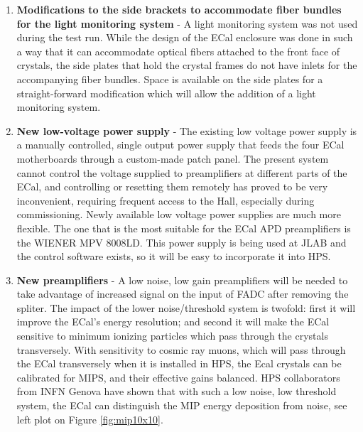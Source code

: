 \begin{enumerate}
\item {\bf Modifications to the side brackets to accommodate fiber bundles for the light monitoring system} -
A light monitoring system was not used during the test run. While the design of the ECal enclosure was done in such a way that it can 
accommodate optical fibers attached to the front face of crystals, the side plates that hold the crystal frames do not have inlets for the accompanying fiber bundles.
Space is available on the side plates for a straight-forward modification which will allow the addition of a light monitoring system.  
    
\item {\bf New low-voltage power supply} - The existing low voltage power supply is a manually controlled, single output power supply 
that feeds the four ECal motherboards through a custom-made patch panel. The present system cannot control the voltage supplied to preamplifiers at different
parts of the ECal, and controlling or resetting them remotely has proved to be very inconvenient, requiring frequent access to the Hall, especially during commissioning. Newly available low voltage power supplies are much more flexible. The one that is the most suitable for the
ECal APD preamplifiers is the WIENER MPV 8008LD. This power supply is being used at JLAB and the control software exists, so it will be easy to incorporate it into HPS.     

\item {\bf New preamplifiers} - A low noise, low gain preamplifiers will be needed to take advantage of increased signal on the input of FADC after removing the spliter. The impact of the lower noise/threshold system is twofold: first it 
will improve the ECal's energy resolution; and second it will make the ECal sensitive to minimum ionizing particles which pass through the crystals transversely. With sensitivity to cosmic ray muons, which will pass through the ECal transversely when it is installed in HPS, the Ecal crystals can be calibrated for MIPS, and their effective gains balanced.  HPS collaborators from INFN Genova have shown that with such a low noise, low threshold system, the ECal can distinguish the MIP energy deposition from noise, see left plot on Figure \ref{fig:mip10x10}.




\end{enumerate}
